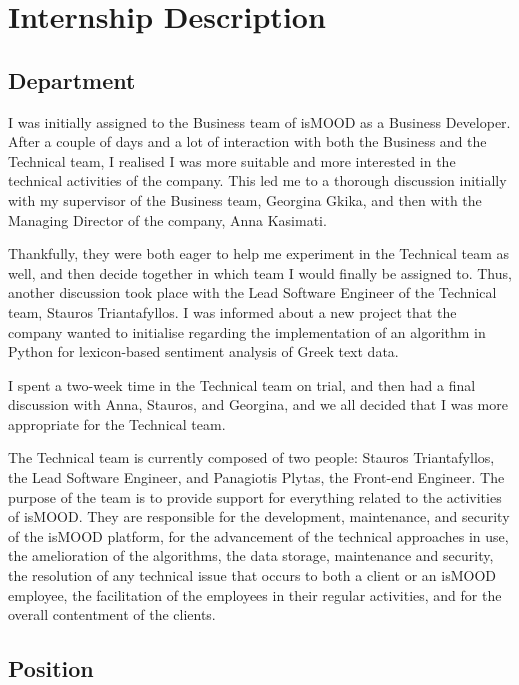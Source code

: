 \section{Internship Description}
\label{sec:internship}

\subsection{Department}
\label{subsec:department}

I was initially assigned to the Business team of isMOOD
as a Business Developer.
After a couple of days and a lot of interaction
with both the Business and the Technical team,
I realised I was more suitable
and more interested in the technical activities
of the company.
This led me to a thorough discussion
initially with my supervisor of the Business team, Georgina Gkika,
and then with the Managing Director of the company,
Anna Kasimati.

Thankfully, they were both eager
to help me experiment in the Technical team as well,
and then decide together in which team
I would finally be assigned to.
Thus, another discussion took place
with the Lead Software Engineer of the Technical team,
Stauros Triantafyllos.
I was informed about a new project
that the company wanted to initialise
regarding the implementation of an algorithm in Python
for lexicon-based sentiment analysis of Greek text data.

I spent a two-week time in the Technical team on trial,
and then had a final discussion with Anna, Stauros, and Georgina,
and we all decided that I was more appropriate for the Technical team.

The Technical team is currently composed of two people:
Stauros Triantafyllos, the Lead Software Engineer,
and Panagiotis Plytas, the Front-end Engineer.
The purpose of the team is to provide support
for everything related to the activities of isMOOD.
They are responsible for the development, maintenance,
and security of the isMOOD platform,
for the advancement of the technical approaches in use,
the amelioration of the algorithms,
the data storage, maintenance and security,
the resolution of any technical issue that occurs
to both a client or an isMOOD employee,
the facilitation of the employees in their regular activities,
and for the overall contentment of the clients.

\subsection{Position}
\label{subsec:position}

